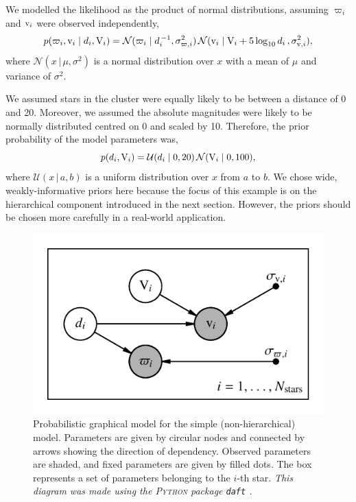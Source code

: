 We modelled the likelihood as the product of normal distributions, assuming \(\varpi_i\) and \(\mathrm{v}_i\) were observed independently,
%
\begin{equation}
    p(\varpi_i, \mathrm{v}_i \mid d_i, \mathrm{V}_i) = \mathcal{N}(\varpi_i \mid d_i^{\,-1}, \sigma_{\varpi, i}^2) \, \mathcal{N}(\mathrm{v}_i \mid \mathrm{V}_i + 5\log_{10}d_i \, , \sigma_{\mathrm{v}, i}^2),\label{eq:hbm-like}
\end{equation}
%
where \(\mathcal{N}(x \,|\, \mu, \sigma^2)\) is a normal distribution over \(x\) with a mean of \(\mu\) and variance of \(\sigma^2\).

We assumed stars in the cluster were equally likely to be between a distance of 0 and 20. Moreover, we assumed the absolute magnitudes were likely to be normally distributed centred on 0 and scaled by 10. Therefore, the prior probability of the model parameters was,
%
\begin{equation}
    p(d_i, \mathrm{V}_i) = \mathcal{U}(d_i \mid 0, 20) \, \mathcal{N}(\mathrm{V}_i \mid 0, 100),
\end{equation}
%
where \(\mathcal{U}(x \,|\, a, b)\) is a uniform distribution over \(x\) from \(a\) to \(b\). We chose wide, weakly-informative priors here because the focus of this example is on the hierarchical component introduced in the next section. However, the priors should be chosen more carefully in a real-world application.

\begin{figure}[tb]
    \centering
    \includegraphics{figures/simple-pgm.pdf}
    \caption[Probabilistic graphical model for the simple (non-hierarchical) model]{Probabilistic graphical model for the simple (non-hierarchical) model. Parameters are given by circular nodes and connected by arrows showing the direction of dependency. Observed parameters are shaded, and fixed parameters are given by filled dots. The box represents a set of parameters belonging to the \(i\)-th star. \emph{This diagram was made using the \textsc{Python} package \texttt{daft} \citep{Foreman-Mackey.Hogg.ea2021}.}}
    \label{fig:simple-pgm}
\end{figure}

